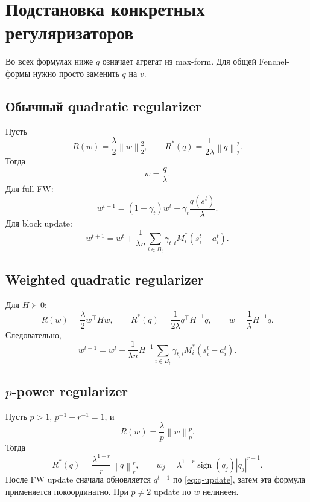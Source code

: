 \documentclass[11pt,a4paper]{article}
\newcommand{\norm}[1]{\left\lVert #1\right\rVert}
\begin{document}
\section{Подстановка конкретных регуляризаторов}

Во всех формулах ниже \(q\) означает агрегат из max-form. Для общей Fenchel-формы нужно просто заменить \(q\) на \(v\).

\subsection{Обычный quadratic regularizer}

Пусть
\[
  R(w)=\frac\lambda2\norm{w}_2^2,\qquad
  R^*(q)=\frac1{2\lambda}\norm{q}_2^2.
\]
Тогда
\begin{equation}
  \boxed{w=\frac q\lambda.}
\end{equation}
Для full FW:
\begin{equation}
  \boxed{
  w^{t+1}=(1-\gamma_t)w^t
  +\gamma_t\frac{q(s^t)}{\lambda}.}
\end{equation}
Для block update:
\begin{equation}
  \boxed{
  w^{t+1}=w^t+\frac1{\lambda n}
  \sum_{i\in B_t}\gamma_{t,i}M_i^*(s_i^t-a_i^t).}
\end{equation}

\subsection{Weighted quadratic regularizer}

Для \(H\succ0\):
\[
  R(w)=\frac\lambda2w^\top Hw,\qquad
  R^*(q)=\frac1{2\lambda}q^\top H^{-1}q,\qquad
  \boxed{w=\frac1\lambda H^{-1}q.}
\]
Следовательно,
\begin{equation}
  \boxed{
  w^{t+1}=w^t+\frac1{\lambda n}H^{-1}
  \sum_{i\in B_t}\gamma_{t,i}M_i^*(s_i^t-a_i^t).}
\end{equation}

\subsection{\(p\)-power regularizer}

Пусть \(p>1\), \(p^{-1}+r^{-1}=1\), и
\[
  R(w)=\frac\lambda p\norm{w}_p^p.
\]
Тогда
\[
  R^*(q)=\frac{\lambda^{1-r}}r\norm{q}_r^r,\qquad
  \boxed{
  w_j=\lambda^{1-r}\operatorname{sign}(q_j)|q_j|^{r-1}.}
\]
После FW update сначала обновляется \(q^{t+1}\) по \eqref{eq:q-update}, затем эта формула применяется покоординатно. При \(p\ne2\) update по \(w\) нелинеен.
\end{document}
